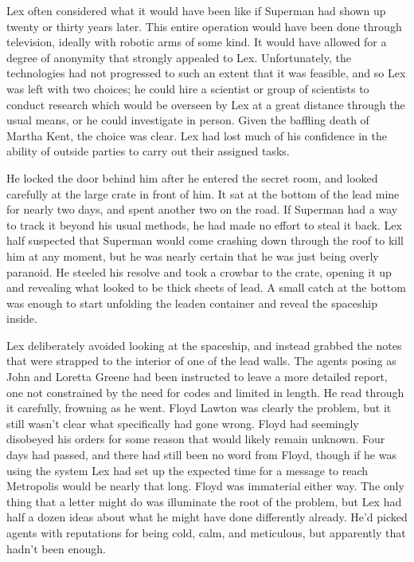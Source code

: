 \documentclass[ebook,12pt]{memoir}
\begin{document}
Lex often considered what it would have been like if Superman had shown
up twenty or thirty years later. This entire operation would have been
done through television, ideally with robotic arms of some kind. It
would have allowed for a degree of anonymity that strongly appealed to
Lex. Unfortunately, the technologies had not progressed to such an
extent that it was feasible, and so Lex was left with two choices; he
could hire a scientist or group of scientists to conduct research which
would be overseen by Lex at a great distance through the usual means, or
he could investigate in person. Given the baffling death of Martha Kent,
the choice was clear. Lex had lost much of his confidence in the ability
of outside parties to carry out their assigned tasks.

He locked the door behind him after he entered the secret room, and
looked carefully at the large crate in front of him. It sat at the
bottom of the lead mine for nearly two days, and spent another two on
the road. If Superman had a way to track it beyond his usual methods, he
had made no effort to steal it back. Lex half suspected that Superman
would come crashing down through the roof to kill him at any moment, but
he was nearly certain that he was just being overly paranoid. He steeled
his resolve and took a crowbar to the crate, opening it up and revealing
what looked to be thick sheets of lead. A small catch at the bottom was
enough to start unfolding the leaden container and reveal the spaceship
inside.

Lex deliberately avoided looking at the spaceship, and instead grabbed
the notes that were strapped to the interior of one of the lead walls.
The agents posing as John and Loretta Greene had been instructed to
leave a more detailed report, one not constrained by the need for codes
and limited in length. He read through it carefully, frowning as he
went. Floyd Lawton was clearly the problem, but it still wasn't clear
what specifically had gone wrong. Floyd had seemingly disobeyed his
orders for some reason that would likely remain unknown. Four days had
passed, and there had still been no word from Floyd, though if he was
using the system Lex had set up the expected time for a message to reach
Metropolis would be nearly that long. Floyd was immaterial either way.
The only thing that a letter might do was illuminate the root of the
problem, but Lex had half a dozen ideas about what he might have done
differently already. He'd picked agents with reputations for being cold,
calm, and meticulous, but apparently that hadn't been enough.
\end{document}
